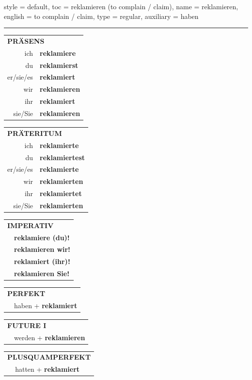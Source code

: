 \begin{verbentry}{
  style = {default},
  toc = {reklamieren (to complain / claim)},
  name = {reklamieren},
  english = {to complain / claim},
  type = {regular},
  auxiliary = {haben}
}


\vspace{5pt}
\hrule
\vspace{5pt}

\begin{tabular}{rl}
\multicolumn{2}{l}{\textbf{PRÄSENS}}\\
ich & \textbf{reklamiere}\\
du & \textbf{reklamierst}\\
er/sie/es & \textbf{reklamiert}\\
wir & \textbf{reklamieren}\\
ihr & \textbf{reklamiert}\\
sie/Sie & \textbf{reklamieren}\\
\end{tabular}
\hfill
\begin{tabular}{rl}
\multicolumn{2}{l}{\textbf{PRÄTERITUM}}\\
ich & \textbf{reklamierte}\\
du & \textbf{reklamiertest}\\
er/sie/es & \textbf{reklamierte}\\
wir & \textbf{reklamierten}\\
ihr & \textbf{reklamiertet}\\
sie/Sie & \textbf{reklamierten}\\
\end{tabular}
\hfill
\begin{tabular}{rl}
\multicolumn{2}{l}{\textbf{IMPERATIV}}\\
& \textbf{reklamiere (du)!}\\
& \textbf{reklamieren wir!}\\
& \textbf{reklamiert (ihr)!}\\
& \textbf{reklamieren Sie!}\\
\end{tabular}

\vspace{10pt}

\begin{tabular}{rl}
\multicolumn{2}{l}{\textbf{PERFEKT}}\\
& haben + \textbf{reklamiert}\\
\end{tabular}
\hfill
\begin{tabular}{rl}
\multicolumn{2}{l}{\textbf{FUTURE I}}\\
& werden + \textbf{reklamieren}\\
\end{tabular}
\hfill
\begin{tabular}{rl}
\multicolumn{2}{l}{\textbf{PLUSQUAMPERFEKT}}\\
& hatten + \textbf{reklamiert}\\
\end{tabular}


\end{verbentry}
